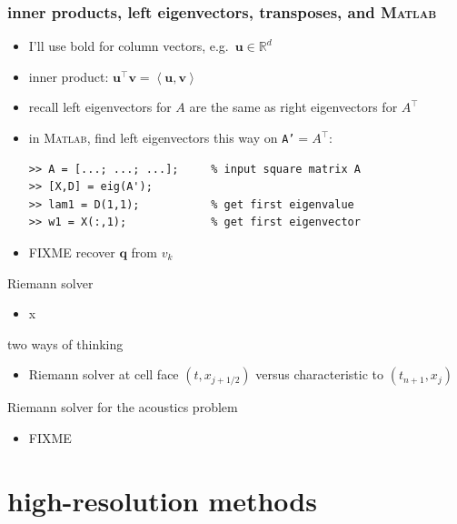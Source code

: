 \documentclass[10pt,hyperref]{beamer}
\newcommand{\bq}{\mathbf{q}}
\newcommand{\bv}{\mathbf{v}}
\newcommand{\bu}{\mathbf{u}}
\newcommand{\RR}{\mathbb{R}}
\newcommand{\Matlab}{\textsc{Matlab}\xspace}
\newcommand{\ip}[2]{\left<#1,#2\right>}
\begin{document}
\begin{frame}[fragile]
\frametitle{inner products, left eigenvectors, transposes, and \Matlab}

\begin{itemize}
\item I'll use bold for column vectors, e.g.~$\bu\in\RR^d$
\item inner product: \quad $\bu^\top \bv = \ip{\bu}{\bv}$
\item recall left eigenvectors for $A$ are the same as right eigenvectors for $A^\top$
\item in \Matlab, find left eigenvectors this way on \texttt{A'}$=A^\top$:
\begin{Verbatim}[fontsize=\small]
>> A = [...; ...; ...];     % input square matrix A
>> [X,D] = eig(A');
>> lam1 = D(1,1);           % get first eigenvalue
>> w1 = X(:,1);             % get first eigenvector
\end{Verbatim}
\item FIXME recover $\bq$ from $v_k$
\end{itemize}
\end{frame}


\begin{frame}{Riemann solver}

\begin{itemize}
\item x
\end{itemize}
\end{frame}


\begin{frame}{two ways of thinking}

\begin{itemize}
\item Riemann solver at cell face $(t,x_{j+1/2})$ versus characteristic to $(t_{n+1},x_j)$
\end{itemize}
\end{frame}


\begin{frame}{Riemann solver for the acoustics problem}

\begin{itemize}
\item FIXME
\end{itemize}
\end{frame}


\section{high-resolution methods}
\end{document}
